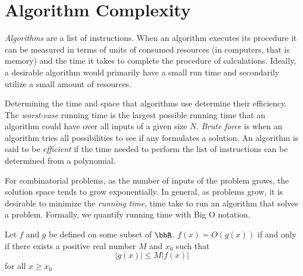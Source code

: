 \section{Algorithm Complexity}
\textit{Algorithms} are a list of instructions.  When an algorithm executes its procedure it can be measured in terms of units of consumed resources (in computers, that is memory) and the time it takes to complete the procedure of calculations.  Ideally, a desirable algorithm would primarily have a small run time and secondarily utilize a small amount of resources.

Determining the time and space that algorithms use determine their efficiency.  The \textit{worst-case} running time is the largest possible running time that an algorithm could have over all inputs of a given size $N$.  \textit{Brute force} is when an algorithm tries all possibilities to see if any formulates a solution.  An algorithm is said to be \textit{efficient} if the time needed to perform the list of instructions can be determined from a polynomial. %

For combinatorial problems, as the number of inputs of the problem grows, the solution space tends to grow exponentially.  In general, as problems grow, it is desirable to minimize the \textit{running time}, time take to run an algorithm that solves a problem. Formally, we quantify running time with Big O notation.
\begin{definition}
Let $f$ and $g$ be defined on some subset of $\bbR$.  $f(x) = O\left(g(x)\right)$ if and only if there exists a positive real number $M$ and $x_0$ such that $$\left\vert g(x)\right\vert \leq M \left\vert f(x) \right\vert$$
for all $x \geq x_0$
\end{definition}



